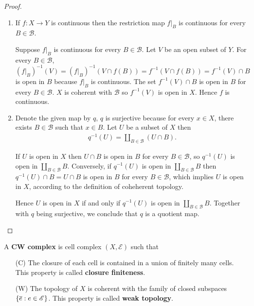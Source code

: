 \begin{proof}
	\begin{enumerate}[label={(\alph*)}]
		\item If \( f: X\to Y \) is continuous then the restriction map \( f\vert_{B} \) is continuous for every \( B \in \mathscr{B} \).

		      Suppose \( f\vert_{B} \) is continuous for every \( B \in \mathscr{B} \). Let \( V \) be an open subset of \( Y \). For every \( B \in \mathscr{B} \), \( {(f\vert_{B})}^{-1}(V) = {(f\vert_{B})}^{-1}(V \cap f(B)) = f^{-1}(V\cap f(B)) = f^{-1}(V) \cap B \) is open in \( B \) because \( f\vert_{B} \) is continuous. The set \( f^{-1}(V) \cap B \) is open in \( B \) for every \( B \in \mathscr{B} \). \( X \) is coherent with \( \mathscr{B} \) so \( f^{-1}(V) \) is open in \( X \). Hence \( f \) is continuous.
		\item Denote the given map by \( q \), \( q \) is surjective because for every \( x\in X \), there exists \( B \in \mathscr{B} \) such that \( x \in B \). Let \( U \) be a subset of \( X \) then
		      \begin{align*}
			      q^{-1}(U) = \coprod_{B\in\mathscr{B}} (U\cap B).
		      \end{align*}

		      If \( U \) is open in \( X \) then \( U\cap B \) is open in \( B \) for every \( B\in\mathscr{B} \), so \( q^{-1}(U) \) is open in \( \coprod_{B\in\mathscr{B}}B \). Conversely, if \( q^{-1}(U) \) is open in \( \coprod_{B\in\mathscr{B}}B \) then \( q^{-1}(U) \cap B = U\cap B \) is open in \( B \) for every \( B\in\mathscr{B} \), which implies \( U \) is open in \( X \), according to the definition of coheherent topology.

		      Hence \( U \) is open in \( X \) if and only if \( q^{-1}(U) \) is open in \( \coprod_{B\in\mathscr{B}}B \). Together with \( q \) being surjective, we conclude that \( q \) is a quotient map.
	\end{enumerate}
\end{proof}

A \textbf{CW complex} is cell complex \( (X, \mathscr{E}) \) such that
\begin{itemize}
	\item [(C)] The closure of each cell is contained in a union of finitely many cells. This property is called \textbf{closure finiteness}.
	\item [(W)] The topology of \( X \) is coherent with the family of closed subspaces \( \left\{{ \overline{e} : e \in \mathscr{E} }\right\} \). This property is called \textbf{weak topology}.
\end{itemize}

